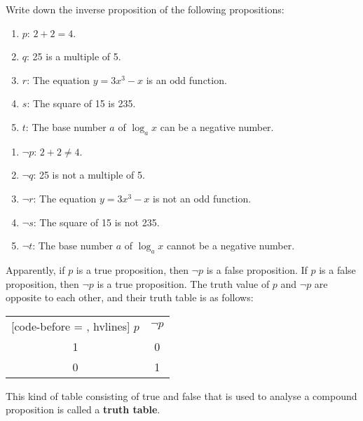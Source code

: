 \documentclass{report}
\newcounter{example}
\begin{document}
\vspace{0.5cm}
\begin{example}
    \item Write down the inverse proposition of the following propositions:
    \begin{enumerate}[label=, leftmargin=*]
        \item $p$: $2 + 2 = 4$.
        \item $q$: 25 is a multiple of 5.
        \item $r$: The equation $y = 3x^3 - x$ is an odd function.
        \item $s$: The square of 15 is 235.
        \item $t$: The base number $a$ of $\log_a x$ can be a negative number.
    \end{enumerate}
\end{example}
\begin{solution}
    \item \begin{enumerate}[label=, leftmargin=*]
        \item $\neg p$: $2 + 2 \neq 4$.
        \item $\neg q$: 25 is not a multiple of 5.
        \item $\neg r$: The equation $y = 3x^3 - x$ is not an odd function.
        \item $\neg s$: The square of 15 is not 235.
        \item $\neg t$: The base number $a$ of $\log_a x$ cannot be a negative number.
    \end{enumerate}
\end{solution}

Apparently, if $p$ is a true proposition, then $\neg p$ is a false proposition.
If $p$ is a false proposition, then $\neg p$ is a true proposition. The truth
value of $p$ and $\neg p$ are opposite to each other, and their truth table is
as follows:
\begin{center}
    \begin{NiceTabular}{|c|c|}[code-before = , hvlines]
        $p$ & $\neg p$ \\
        1   & 0        \\
        0   & 1        \\
    \end{NiceTabular}
\end{center}
This kind of table consisting of true and false that is used to analyse a compound proposition is called a \textbf{truth table}.
\end{document}
